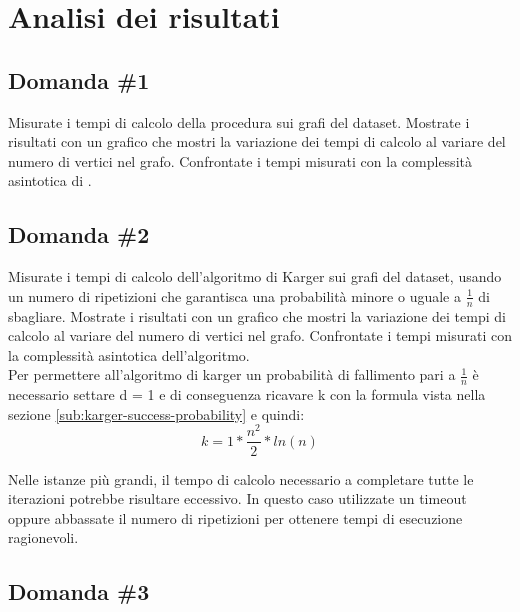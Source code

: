 \section{Analisi dei risultati}
\label{cap:performance-analysis}

\subsection{Domanda \#1}
\label{sec:question-1}

\begin{displayquote}
Misurate i tempi di calcolo della procedura  sui grafi del dataset. Mostrate i risultati con un grafico che mostri la variazione dei tempi di calcolo al variare del numero di vertici nel grafo. Confrontate i tempi misurati con la complessità asintotica di .
\end{displayquote}

\subsection{Domanda \#2}
\label{sec:question-2}

\begin{displayquote}
Misurate i tempi di calcolo dell'algoritmo di Karger sui grafi del dataset, usando un numero di ripetizioni che garantisca una probabilità minore o uguale a $\frac{1}{n}$ di sbagliare. Mostrate i risultati con un grafico che mostri la variazione dei tempi di calcolo al variare del numero di vertici nel grafo. Confrontate i tempi misurati con la complessità asintotica dell'algoritmo. \\


Per permettere all'algoritmo di karger un probabilità di fallimento pari a $\frac{1}{n}$ è necessario settare d = 1 e di conseguenza ricavare k con la formula vista nella sezione \ref{sub:karger-success-probability} e quindi:
$$ k = 1 * \frac{n^2}{2} * ln(n)$$

Nelle istanze più grandi, il tempo di calcolo necessario a completare tutte le iterazioni potrebbe risultare eccessivo. In questo caso utilizzate un timeout oppure abbassate il numero di ripetizioni per ottenere tempi di esecuzione ragionevoli.
\end{displayquote}

\subsection{Domanda \#3}
\label{sec:question-3}

